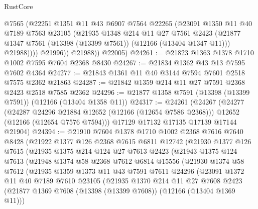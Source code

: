 \begin{lexlean}{RustCore}
\begin{coremodule}
                @7565
                (@22251
                  @1351
                  @11
                  @43
                  @6907
                  @7564
                  @22265
                  (@23091
                    @1350
                    @11
                    @40
                    @7189
                    @7563
                    @23105
                    (@21935
                      @1348
                      @214
                      @11
                      @27
                      @7561
                      @2423
                      (@21877 @1347 @7561 (@13398 (@13399 @7561)) (@12166 (@13404 @1347 @11)))
                      @21988))))
              @21996))
          @21988))
      @22005)
@24261 := @21823 @1363 @1378 @1710 @1002 @7595 @7604 @2368 @8430
@24267 := @21834 @1362 @43 @13 @7595 @7602 @4364
@24277 := @21843 @1361 @11 @40 @3144 @7594 @7601 @2518 @7575 @2362 @21863
@24287 := @21842 @1359 @214 @11 @27 @7591 @2368 @2423 @2518 @7585 @2362
@24296 := @21877 @1358 @7591 (@13398 (@13399 @7591)) (@12166 (@13404 @1358 @11))
@24317 := @24261
    (@24267
      (@24277
        (@24287 @24296 @21884 @12652 (@12166 (@12654 @7586 @2368)))
        @12652
        (@12166 (@12654 @7576 @7594)))
      @17129
      @17132
      @17135
      @17139
      @17144
      @21904)
@24394 := @21910
    @7604
    @1378
    @1710
    @1002
    @2368
    @7616
    @7640
    @8428
    (@21922
      @1377
      @126
      @2368
      @7615
      @6811
      @12742
      (@21930
        @1377
        @126
        @7615
        (@21935
          @1375
          @214
          @124
          @27
          @7613
          @2423
          (@21943
            @1375
            @124
            @7613
            (@21948
              @1374
              @58
              @2368
              @7612
              @6814
              @15556
              (@21930
                @1374
                @58
                @7612
                (@21935
                  @1359
                  @1373
                  @11
                  @43
                  @7591
                  @7611
                  @24296
                  (@23091
                    @1372
                    @11
                    @40
                    @7189
                    @7610
                    @23105
                    (@21935
                      @1370
                      @214
                      @11
                      @27
                      @7608
                      @2423
                      (@21877 @1369 @7608 (@13398 (@13399 @7608)) (@12166 (@13404 @1369 @11)))

\end{coremodule}
\end{lexlean}
